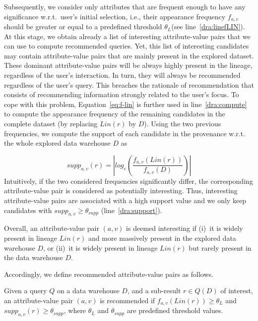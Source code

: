  
Subsequently, we consider only attributes that are frequent enough to have any significance w.r.t.~user's initial selection, i.e., their appearance frequency $f_{a,v}$ should be greater or equal to a predefined threshold $\theta_L$(see line~\ref{dra:linefLIN}). 
At this stage, we obtain already a list of interesting attribute-value pairs that we can use to compute recommended queries. Yet, this list of interesting candidates may contain attribute-value pairs that are mainly present in the explored dataset.
These dominant attribute-value pairs will be always highly present in the lineage, regardless of the user's interaction. In turn, they will always be recommended regardless of the user's query. This breaches the rationale of recommendation that consists of recommending information strongly related to the user's focus. 
To cope with this problem, Equation~\ref{eq:f-lin} is further used in line~\ref{dra:compute} to compute the appearance frequency of the remaining candidates in the complete dataset (by replacing $Lin(r)$ by $D$). Using the two previous frequencies, we compute the support of each candidate in the provenance w.r.t. the whole explored data warehouse $D$ as

\begin{equation}
supp_{a,v}(r) = \left| log_e \left(\frac{ f_{a,v}(Lin(r) )} {f_{a,v}(D)} \right) \right|
\label{eq:support}
\end{equation}
Intuitively, if the two considered frequencies significantly differ, the corresponding attribute-value pair is considered as potentially interesting. Thus, interesting attribute-value pairs are associated with a high support value and we only keep candidates with $supp_{a,v}  \geq  \theta_{supp}$ (line~\ref{dra:support}).



Overall, an attribute-value pair $(a,v)$ is deemed interesting if (i)~it is widely present in lineage $Lin(r)$ and more massively present in the explored data warehouse $D$, or
(ii)~it is widely present in lineage $Lin(r)$ but rarely present in the data warehouse $D$.


Accordingly, we define recommended attribute-value pairs as follows.
\begin{definition}
\label{def:att-val}
Given a query $Q$ on a data warehouse $D$, and a sub-result $r \in Q(D)$ of interest, an attribute-value pair $(a,v)$ is recommended if $f_{a,v}(Lin(r)) \geq \theta_L$ and $supp_{a,v}(r) \geq
\theta_{supp}$, where $\theta_{L}$ and $\theta_{supp}$ are predefined threshold values. 
\label{def:av-pairs}
\end{definition}

